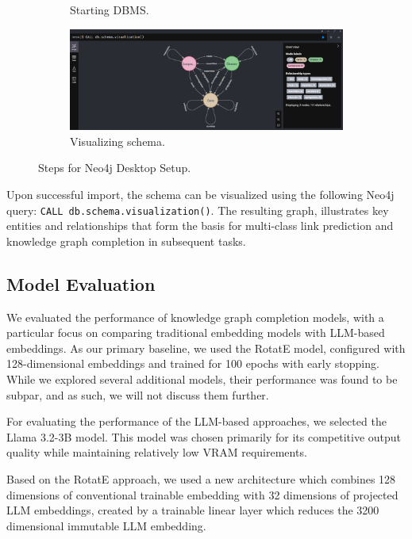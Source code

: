 \begin{figure}
\begin{subfigure}[b]{0.49\textwidth}
        \caption{Starting DBMS.}
    \end{subfigure}
    \hfill
    \begin{subfigure}[b]{0.49\textwidth}
        \centering
        \includegraphics[width=\textwidth]{images/neo4j-setup/7}
        \caption{Visualizing schema.}
    \end{subfigure}

    \caption{Steps for Neo4j Desktop Setup.}
    \label{fig:neo4j-setup}
\end{figure}

Upon successful import, the schema can be visualized using the following Neo4j query: \texttt{CALL db.schema.visualization()}.
The resulting graph, illustrates key entities and relationships that form the basis for multi-class link prediction and knowledge graph completion in subsequent tasks.

\subsection*{Model Evaluation}

We evaluated the performance of knowledge graph completion models, with a particular focus on comparing traditional embedding models with LLM-based embeddings.
As our primary baseline, we used the RotatE model, configured with 128-dimensional embeddings and trained for 100 epochs with early stopping.
While we explored several additional models, their performance was found to be subpar, and as such, we will not discuss them further.

For evaluating the performance of the LLM-based approaches, we selected the Llama 3.2-3B model.
This model was chosen primarily for its competitive output quality while maintaining relatively low VRAM requirements.

Based on the RotatE approach, we used a new architecture which combines 128 dimensions of conventional trainable embedding with 32 dimensions of projected LLM embeddings,
created by a trainable linear layer which reduces the 3200 dimensional immutable LLM embedding.


